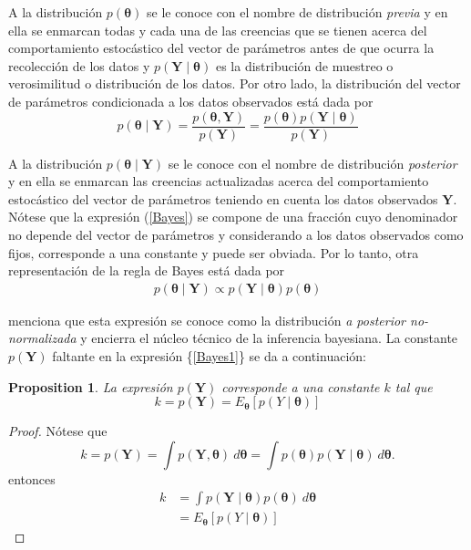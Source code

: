 \documentclass[
  spanish,
  letter]{book}
\newtheorem{proposition}{Proposition}[chapter]
\theoremstyle{definition}
\theoremstyle{definition}
\theoremstyle{definition}
\theoremstyle{remark}
\begin{document}
A la distribución \(p(\boldsymbol \theta)\) se le conoce con el nombre de distribución \emph{previa} y en ella se enmarcan todas y cada una de las creencias que se tienen acerca del comportamiento estocástico del vector de parámetros antes de que ocurra la recolección de los datos y \(p(\mathbf{Y} \mid \boldsymbol \theta)\) es la distribución de muestreo o verosimilitud o distribución de los datos. Por otro lado, la distribución del vector de parámetros condicionada a los datos observados está dada por
\begin{equation}\label{Bayes}
p(\boldsymbol \theta\mid \mathbf{Y})=\frac{p(\boldsymbol \theta,\mathbf{Y})}{p(\mathbf{Y})}=\frac{p(\boldsymbol \theta)p(\mathbf{Y} \mid \boldsymbol \theta)}{p(\mathbf{Y})}
\end{equation}

A la distribución \(p(\boldsymbol \theta\mid \mathbf{Y})\) se le conoce con el nombre de distribución \emph{posterior} y en ella se enmarcan las creencias actualizadas acerca del comportamiento estocástico del vector de parámetros teniendo en cuenta los datos observados \(\mathbf{Y}\). Nótese que la expresión (\ref{Bayes}) se compone de una fracción cuyo denominador no depende del vector de parámetros y considerando a los datos observados como fijos, corresponde a una constante y puede ser obviada. Por lo tanto, otra representación de la regla de Bayes está dada por
\begin{align}\label{Bayes1}
p(\boldsymbol \theta\mid \mathbf{Y})\propto p(\mathbf{Y} \mid \boldsymbol \theta)p(\boldsymbol \theta)
\end{align}

 menciona que esta expresión se conoce como la distribución \emph{a posterior no-normalizada} y encierra el núcleo técnico de la inferencia bayesiana. La constante \(p(\mathbf{Y})\) faltante en la expresión \{\ref{Bayes1}\} se da a continuación:

\begin{proposition}
\protect\hypertarget{prp:unnamed-chunk-12}{}{\label{prp:unnamed-chunk-12} }La expresión \(p(\mathbf{Y})\) corresponde a una constante \(k\) tal que
\begin{equation*}
k=p(\mathbf{Y})=E_{\boldsymbol \theta}[p(Y \mid \boldsymbol \theta)]
\end{equation*}
\end{proposition}

\begin{proof}
\iffalse{} {Proof. } \fi{}Nótese que
\begin{equation*}
k=p(\mathbf{Y})=\int p(\mathbf{Y},\boldsymbol \theta)\ d\boldsymbol \theta=\int p(\boldsymbol \theta)p(\mathbf{Y} \mid \boldsymbol \theta)\ d\boldsymbol \theta.
\end{equation*}
entonces
\begin{align*}
k&=\int p(\mathbf{Y} \mid \boldsymbol \theta)p(\boldsymbol \theta)\ d\boldsymbol \theta\\
&=E_{\boldsymbol \theta}[p(Y \mid \boldsymbol \theta)]
\end{align*}
\end{proof}
\end{document}
